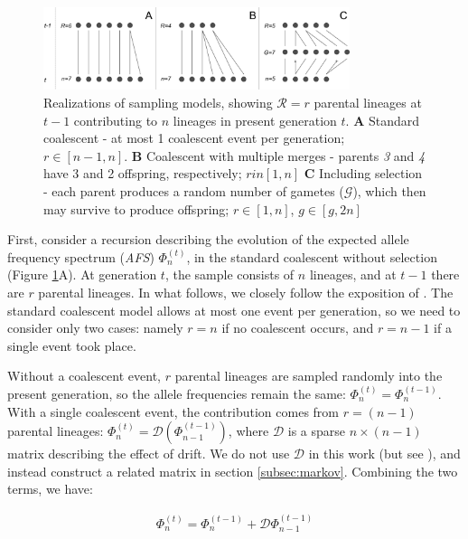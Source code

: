 \documentclass[review]{elsarticle}
\begin{document}
\begin{figure}[ht]
  \centering
  \includegraphics[width=0.8\textwidth]{fig/schematic.pdf}
  \caption{\label{fig:schematic} Realizations of sampling models, showing $\mathcal{R}=r$ parental
    lineages at $t-1$ contributing to $n$ lineages in present generation $t$. \textbf{A} Standard
    coalescent - at most 1 coalescent event per generation; $r\in[n-1, n]$. \textbf{B} Coalescent with multiple
    merges - parents \textit{3} and \textit{4} have 3 and 2 offspring, respectively; $r in [1, n]$ \textbf{C}
    Including selection - each parent produces a random number of gametes ($\mathcal{G}$), which
    then may survive to produce offspring; $r \in [1, n]$, $g \in [g, 2n]$ }
\end{figure}

First, consider a recursion describing the evolution of the expected allele frequency spectrum
(\textit{AFS}) $\Phi_{n}^{(t)}$, in the standard coalescent without selection (Figure
\ref{fig:schematic}A). At generation $t$, the sample consists of $n$ lineages, and at $t-1$ there
are $r$ parental lineages. In what follows, we closely follow the exposition of
\cite{JouganousEtAl2017}. The standard coalescent model allows at most one event per generation, so
we need to consider only two cases: namely $r=n$ if no coalescent occurs, and $r=n-1$ if a single
event took place.

Without a coalescent event, $r$ parental lineages are sampled randomly into the present generation,
so the allele frequencies remain the same: $\Phi_{n}^{(t)}=\Phi_{n}^{(t-1)}$. With a single
coalescent event, the contribution comes from $r=(n-1)$ parental lineages:
$\Phi_{n}^{(t)}=\mathcal{D}(\Phi_{n-1}^{(t-1)})$, where $\mathcal{D}$ is a sparse $n \times (n-1)$
matrix describing the effect of drift. We do not use $\mathcal{D}$ in this work (but see
\cite{JouganousEtAl2017}), and instead construct a related matrix in section \ref{subsec:markov}.
Combining the two terms, we have:

\begin{align}
  \label{eq:op-neutral}
  \Phi_{n}^{(t)}=\Phi_{n}^{(t-1)}+\mathcal{D} \Phi_{n-1}^{(t-1)}
\end{align}
\end{document}
